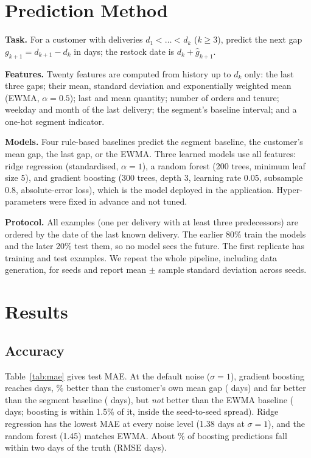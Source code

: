 \documentclass[conference]{IEEEtran}
\begin{document}
\section{Prediction Method}\label{sec:method}
\textbf{Task.} For a customer with deliveries $d_1<\dots<d_k$ ($k\ge 3$), predict the next gap $g_{k+1}=d_{k+1}-d_k$ in days; the restock date is $d_k+\hat g_{k+1}$.

\textbf{Features.} Twenty features are computed from history up to $d_k$ only: the last three gaps; their mean, standard deviation and exponentially weighted mean (EWMA, $\alpha{=}0.5$); last and mean quantity; number of orders and tenure; weekday and month of the last delivery; the segment's baseline interval; and a one-hot segment indicator.

\textbf{Models.} Four rule-based baselines predict the segment baseline, the customer's mean gap, the last gap, or the EWMA. Three learned models use all features: ridge regression (standardised, $\alpha{=}1$), a random forest (200 trees, minimum leaf size 5), and gradient boosting (300 trees, depth 3, learning rate 0.05, subsample 0.8, absolute-error loss), which is the model deployed in the application. Hyper-parameters were fixed in advance and not tuned.

\textbf{Protocol.} All examples (one per delivery with at least three predecessors) are ordered by the date of the last known delivery. The earlier 80\% train the models and the later 20\% test them, so no model sees the future. The first replicate has \NTrain{} training and \NTest{} test examples. We repeat the whole pipeline, including data generation, for \NSeeds{} seeds and report mean $\pm$ sample standard deviation across seeds.

\section{Results}\label{sec:results}

\subsection{Accuracy}
Table~\ref{tab:mae} gives test MAE. At the default noise ($\sigma{=}1$), gradient boosting reaches \MaeGB{} days, \GainOwn\% better than the customer's own mean gap (\MaeOwn{} days) and far better than the segment baseline (\MaeSeg{} days), but \emph{not} better than the EWMA baseline (\MaeEWMA{} days; boosting is within 1.5\% of it, inside the seed-to-seed spread). Ridge regression has the lowest MAE at every noise level (1.38 days at $\sigma{=}1$), and the random forest (1.45) matches EWMA. About \WithinTwo\% of boosting predictions fall within two days of the truth (RMSE \Rmse{} days).
\end{document}
